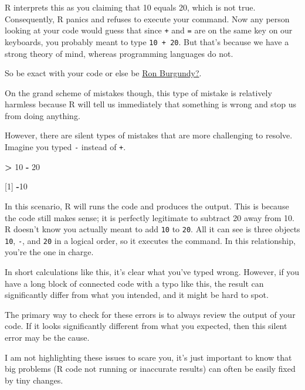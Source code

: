 \documentclass[
]{book}
\newenvironment{Shaded}{\begin{snugshade}}{\end{snugshade}}
\newcommand{\DecValTok}[1]{\textcolor[rgb]{0.00,0.00,0.81}{#1}}
\newcommand{\NormalTok}[1]{#1}
\newcommand{\SpecialCharTok}[1]{\textcolor[rgb]{0.81,0.36,0.00}{\textbf{#1}}}
\begin{document}
R interprets this as you claiming that 10 equals 20, which is not true. Consequently, R panics and refuses to execute your command. Now any person looking at your code would guess that since \texttt{+} and \texttt{=} are on the same key on our keyboards, you probably meant to type \texttt{10\ +\ 20}. But that's because we have a strong theory of mind, whereas programming languages do not.

So be exact with your code or else be \href{https://www.youtube.com/watch?v=X3zfP14pLxc}{Ron Burgundy?}.

On the grand scheme of mistakes though, this type of mistake is relatively harmless because R will tell us immediately that something is wrong and stop us from doing anything.

However, there are silent types of mistakes that are more challenging to resolve. Imagine you typed \texttt{-} instead of \texttt{+}.

\begin{Shaded}
\begin{Highlighting}[]
\SpecialCharTok{\textgreater{}} \DecValTok{10} \SpecialCharTok{{-}} \DecValTok{20}

\NormalTok{[}\DecValTok{1}\NormalTok{] }\SpecialCharTok{{-}}\DecValTok{10}
\end{Highlighting}
\end{Shaded}

In this scenario, R will runs the code and produces the output. This is because the code still makes sense; it is perfectly legitimate to subtract 20 away from 10. R doesn't know you actually meant to add \texttt{10} to \texttt{20}. All it can see is three objects \texttt{10}, \texttt{-}, and \texttt{20} in a logical order, so it executes the command. In this relationship, you're the one in charge.

In short calculations like this, it's clear what you've typed wrong. However, if you have a long block of connected code with a typo like this, the result can significantly differ from what you intended, and it might be hard to spot.

The primary way to check for these errors is to always review the output of your code. If it looks significantly different from what you expected, then this silent error may be the cause.

I am not highlighting these issues to scare you, it's just important to know that big problems (R code not running or inaccurate results) can often be easily fixed by tiny changes.
\end{document}
